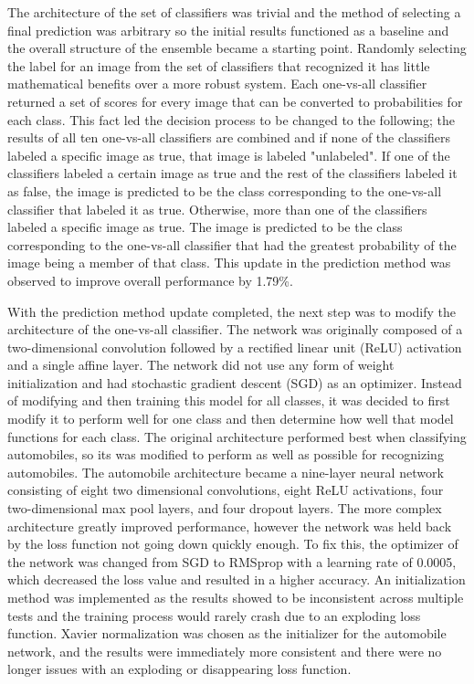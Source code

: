\documentclass[10pt,twocolumn,letterpaper]{article}
\begin{document}
The architecture of the set of classifiers was trivial and the method of selecting a final prediction was arbitrary so the initial results functioned as a baseline and the overall structure of the ensemble became a starting point. Randomly selecting the label for an image from the set of classifiers that recognized it has little mathematical benefits over a more robust system. Each one-vs-all classifier returned a set of scores for every image that can be converted to probabilities for each class. This fact led the decision process to be changed to the following; the results of all ten one-vs-all classifiers are combined and if none of the classifiers labeled a specific image as true, that image is labeled "unlabeled". If one of the classifiers labeled a certain image as true and the rest of the classifiers labeled it as false, the image is predicted to be the class corresponding to the one-vs-all classifier that labeled it as true. Otherwise, more than one of the classifiers labeled a specific image as true. The image is predicted to be the class corresponding to the one-vs-all classifier that had the  greatest probability of the image being a member of that class. This update in the prediction method was observed to improve overall performance by 1.79\%.

With the prediction method update completed, the next step was to modify the architecture of the one-vs-all classifier. The network was originally composed of a two-dimensional convolution followed by a rectified linear unit (ReLU) activation and a single affine layer. The network did not use any form of weight initialization and had stochastic gradient descent (SGD) as an optimizer. Instead of modifying and then training this model for all classes, it was decided to first modify it to perform well for one class and then determine how well that model functions for each class. The original architecture performed best when classifying automobiles, so its was modified to perform as well as possible for recognizing automobiles. The automobile architecture became a nine-layer neural network consisting of eight two dimensional convolutions, eight ReLU activations, four two-dimensional max pool layers, and four dropout layers. The more complex architecture greatly improved performance, however the network was held back by the loss function not going down quickly enough. To fix this, the optimizer of the network was changed from SGD to RMSprop with a learning rate of 0.0005, which decreased the loss value and resulted in a higher accuracy. An initialization method was implemented  as the results showed to be inconsistent across multiple tests and the training process would rarely crash due to an exploding loss function. Xavier normalization was chosen as the initializer for the automobile network, and the results were immediately more consistent and there were no longer issues with an exploding or disappearing loss function.
\end{document}

